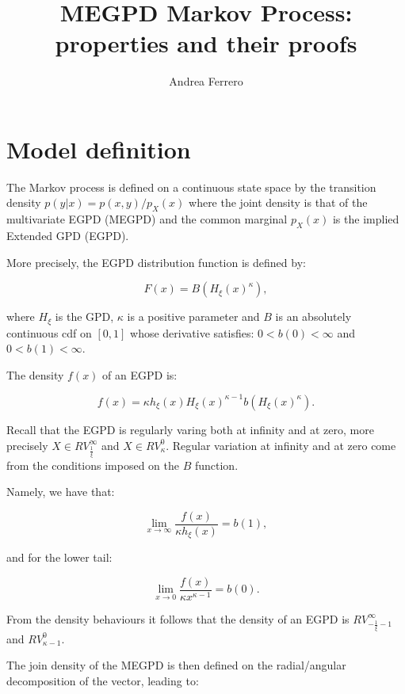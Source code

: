 \documentclass{article}
\title{MEGPD Markov Process: properties and their proofs}
\author{Andrea Ferrero}
\begin{document}
\maketitle

\section{Model definition}

The Markov process is defined on a continuous state space by the transition density $p(y|x) = p(x,y) / p_X(x)$ where the joint density is that of the multivariate EGPD (MEGPD) and the common marginal $p_X(x)$ is the implied Extended GPD (EGPD).

More precisely, the EGPD distribution function is defined by:

\begin{equation*}
  F(x) = B(H_\xi(x)^\kappa),
\end{equation*}

where $H_\xi$ is the GPD, $\kappa$ is a positive parameter and $B$ is an absolutely continuous cdf on $[0, 1]$ whose derivative satisfies: $0<b(0)<\infty$ and $0 < b(1) < \infty$.

The density $f(x)$ of an EGPD is:

\begin{equation*}
  f(x) = \kappa h_\xi(x) H_\xi(x)^{\kappa-1} b(H_\xi(x)^\kappa).
\end{equation*}

Recall that the EGPD is regularly varing both at infinity and at zero, more precisely $X \in RV_{\frac{1}{\xi}}^\infty$ and $X \in RV_\kappa^0$. Regular variation at infinity and at zero come from the conditions imposed on the $B$ function.

Namely, we have that:

\begin{equation*}
  \lim_{x \to \infty} \frac{f(x)}{\kappa h_\xi(x)} = b(1),
\end{equation*}

and for the lower tail:

\begin{equation*}
  \lim_{x \to 0} \frac{f(x)}{\kappa x^{\kappa-1}} = b(0).
\end{equation*}

From the density behaviours it follows that the density of an EGPD is $RV_{-\frac{1}{\xi} - 1}^\infty$ and $RV_{\kappa - 1}^0$.

The join density of the MEGPD is then defined on the radial/angular decomposition of the vector, leading to:
\end{document}
